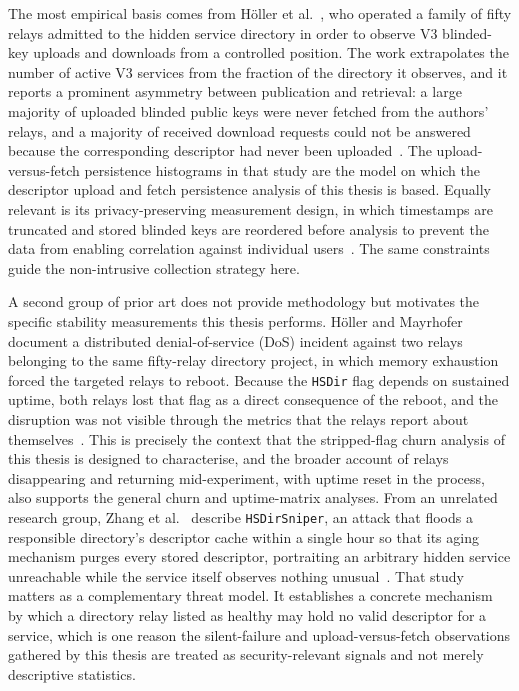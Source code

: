 \documentclass[conference]{IEEEtran}
\begin{document}
The most empirical basis comes from H\"oller et al.~\cite{hoeller2021statev3}, who operated a family of fifty relays admitted to the hidden service directory in order to observe V3 blinded-key uploads and downloads from a controlled position. The work extrapolates the number of active V3 services from 
the fraction of the directory it observes, and it reports a prominent asymmetry between publication and retrieval: a large majority of uploaded blinded public keys were never fetched from the authors' relays, and a majority of received download requests could not be answered because the corresponding descriptor 
had never been uploaded~\cite{hoeller2021statev3}. The upload-versus-fetch persistence histograms in that study are the model on which the descriptor upload and fetch persistence analysis of this thesis is based. Equally relevant is its privacy-preserving measurement design, in which timestamps are truncated and 
stored blinded keys are reordered before analysis to prevent the data from enabling correlation against individual users~\cite{hoeller2021statev3}. The same constraints guide the non-intrusive collection strategy here.
 
A second group of prior art does not provide methodology but motivates the specific stability measurements this thesis performs. H\"oller and Mayrhofer~\cite{hoeller2024ddos} document a distributed denial-of-service (DoS) incident against two relays belonging to the same fifty-relay directory project, in which memory 
exhaustion forced the targeted relays to reboot. Because the \texttt{HSDir} flag depends on sustained uptime, both relays lost that flag as a direct consequence of the reboot, and the disruption was not visible through the metrics that the relays report about themselves~\cite{hoeller2024ddos}. This is precisely the 
context that the stripped-flag churn analysis of this thesis is designed to characterise, and the broader account of relays disappearing and returning mid-experiment, with uptime reset in the process, also supports the general churn and uptime-matrix analyses. From an unrelated research group, Zhang et al.~\cite{zhang2024hsdirsniper} 
describe \texttt{HSDirSniper}, an attack that floods a responsible directory's descriptor cache within a single hour so that its aging mechanism purges every stored descriptor, portraiting an arbitrary hidden service unreachable while the service itself observes nothing unusual~\cite{zhang2024hsdirsniper}. That study matters 
as a complementary threat model. It establishes a concrete mechanism by which a directory relay listed as healthy may hold no valid descriptor for a service, which is one reason the silent-failure and upload-versus-fetch observations gathered by this thesis are 
treated as security-relevant signals and not merely descriptive statistics.
\end{document}

